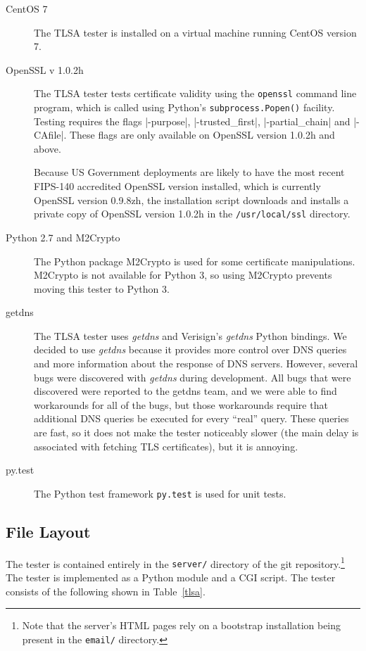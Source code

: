 \documentclass[preprint,3p,11pt]{elsarticle}
\begin{document}
\begin{description}
\item[CentOS 7] The TLSA tester is installed on a virtual machine
  running CentOS version 7.

\item[OpenSSL v 1.0.2h]
The TLSA tester tests certificate validity using the \verb+openssl+
command line program, which is called using Python's \verb+subprocess.Popen()+
facility. Testing requires the flags |-purpose|, |-trusted_first|,
|-partial_chain| and |-CAfile|. These flags are only available on
OpenSSL version 1.0.2h and above.

Because US Government deployments are likely to have the
most recent FIPS-140 accredited OpenSSL version installed, which is
currently OpenSSL version 0.9.8zh, the installation script downloads and
installs a private copy of OpenSSL version 1.0.2h in the
\verb+/usr/local/ssl+ directory.

\item[Python 2.7 and M2Crypto] The Python package M2Crypto is used for some
certificate manipulations. M2Crypto is not available for Python 3, so
using M2Crypto prevents moving this tester to Python 3.

\item[getdns] The TLSA tester uses \emph{getdns} and Verisign's \emph{getdns} Python
bindings. We decided to use \emph{getdns} because it provides more control
over DNS queries and more information about the response of DNS
servers. However, several bugs were discovered with \emph{getdns} during
development. All bugs that were discovered were reported to the getdns
team, and we were able to find workarounds for all of the bugs, but
those workarounds require that additional DNS queries be
executed for every ``real'' query. These queries are fast, so it does
not make the tester noticeably slower (the main delay is associated
with fetching TLS certificates), but it is annoying.

\item[py.test] The Python test framework \texttt{py.test} is used
for unit tests. 
\end{description}

\subsection{File Layout}

The tester is contained entirely in the {\tt server/} directory of the
git repository.\footnote{Note that the server's HTML pages rely on a bootstrap installation
being present in the {\tt email/} directory.} The tester is implemented as a Python module and a CGI
script. The tester consists of the following shown in Table~\ref{tlsa}.
\end{document}
